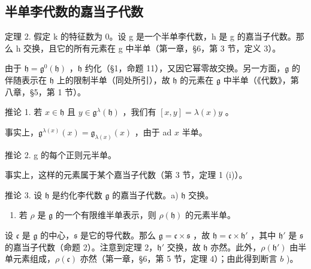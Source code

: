 \subsection{半单李代数的嘉当子代数}

定理 2. 假定 k 的特征数为 0。设 g 是一个半单李代数，h 是 g 的嘉当子代数。那么 h 交换，且它的所有元素在 g 中半单（第一章，§6，第 3 节，定义 3）。

由于 \(\mathfrak{h} = \mathfrak{g}^0 (\mathfrak{h})\) ，\(\mathfrak{h}\) 约化（§1，命题 11），又因它幂零故交换。另一方面，\(\mathfrak{g}\) 的伴随表示在 \(\mathfrak{h}\) 上的限制半单（同处所引），故 \(\mathfrak{h}\) 的元素在 \(\mathfrak{g}\) 中半单（《代数》，第八章，§5，第 1 节）。

推论 1. 若 \(x \in \mathfrak{h}\) 且 \(y \in \mathfrak{g}^{\lambda}(\mathfrak{h})\) ，我们有 \([x, y] = \lambda(x)y\) 。

事实上，\(\mathfrak{g}^{\lambda (x)}(x) = \mathfrak{g}_{\lambda (x)}(x)\) ，由于 ad \(x\) 半单。

推论 2. g 的每个正则元半单。

事实上，这样的元素属于某个嘉当子代数（第 3 节，定理 1 (i)）。

推论 3. 设 \(\mathfrak{h}\) 是约化李代数 \(\mathfrak{g}\) 的嘉当子代数。a) \(\mathfrak{h}\) 交换。

\begin{enumerate}
\def\labelenumi{\alph{enumi})}
\setcounter{enumi}{1}
\tightlist
\item
  若 \(\rho\) 是 \(\mathfrak{g}\) 的一个有限维半单表示，则 \(\rho(\mathfrak{h})\) 的元素半单。
\end{enumerate}

设 \(\mathfrak{c}\) 是 \(\mathfrak{g}\) 的中心，\(\mathfrak{s}\) 是它的导代数。那么 \(\mathfrak{g} = \mathfrak{c} \times \mathfrak{s}\) ，故 \(\mathfrak{h} = \mathfrak{c} \times \mathfrak{h}'\) ，其中 \(\mathfrak{h}'\) 是 \(\mathfrak{s}\) 的嘉当子代数（命题 2）。注意到定理 2，\(\mathfrak{h}'\) 交换，故 \(\mathfrak{h}\) 亦然。此外，\(\rho(\mathfrak{h}')\) 由半单元素组成，\(\rho(\mathfrak{c})\) 亦然（第一章，§6，第 5 节，定理 4）；由此得到断言 \(b\) )。

